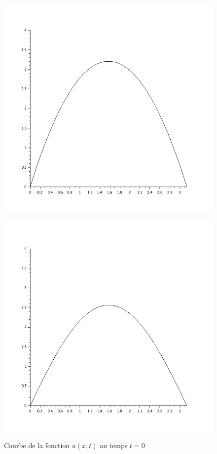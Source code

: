\documentclass[a4paper,12pt]{report}
\begin{document}
\begin{figure}[h!]
   \begin{minipage}[b]{0.40\linewidth}
      \includegraphics[scale=0.3]{ex5_fig7.png}\\
	  \caption{Courbe  de la fonction $u(x,t)$ au temps $t=0$}
   \end{minipage}\hfill
   \begin{minipage}[b]{0.48\linewidth}   
      \includegraphics[scale=0.3]{ex5_fig8.png}\\

\end{minipage}
\end{figure}
\end{document}

